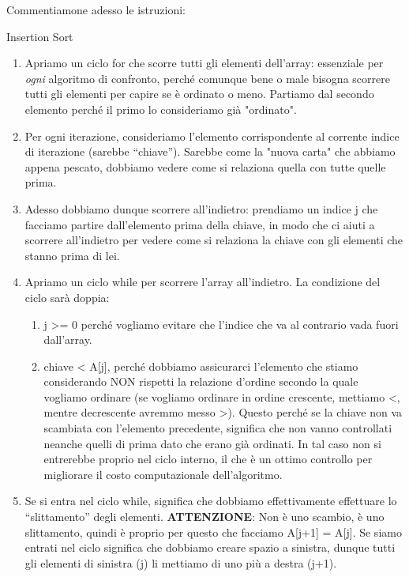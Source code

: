 \documentclass[12pt]{report}
\begin{document}
    Commentiamone adesso le istruzioni:
    \begin{algoritmo}{Insertion Sort}{}
    	
    	\begin{enumerate}
    		
    		\item Apriamo un ciclo for che scorre tutti gli elementi dell'array: essenziale per \textit{ogni} algoritmo di confronto, perché comunque bene o male bisogna scorrere tutti gli elementi per capire se è ordinato o meno. Partiamo dal secondo elemento perché il primo lo consideriamo già "ordinato".
    				
    		\item Per ogni iterazione, consideriamo l'elemento corrispondente al corrente indice di iterazione (sarebbe “chiave”). Sarebbe come la "nuova carta" che abbiamo appena pescato, dobbiamo vedere come si relaziona quella con tutte quelle prima.
    				
    		\item Adesso dobbiamo dunque scorrere all'indietro: prendiamo un indice j che facciamo partire dall'elemento prima della chiave, in modo che ci aiuti a scorrere all'indietro per vedere come si relaziona la chiave con gli elementi che stanno prima di lei.
    				
    		\item Apriamo un ciclo while per scorrere l’array all’indietro. La condizione del ciclo sarà doppia:
    		\begin{enumerate}
    					
    			\item j >= 0 perché vogliamo evitare che l'indice che va al contrario vada fuori dall'array.
    					
    			\item chiave < A[j], perché dobbiamo assicurarci l’elemento che stiamo considerando NON rispetti la relazione d’ordine secondo la quale vogliamo ordinare (se vogliamo ordinare in ordine crescente, mettiamo <, mentre decrescente avremmo messo >). Questo perché se la chiave non va scambiata con l’elemento precedente, significa che non vanno controllati neanche quelli di prima dato che erano già ordinati. In tal caso non si entrerebbe proprio nel ciclo interno, il che è un ottimo controllo per migliorare il costo computazionale dell’algoritmo.
    					
    		\end{enumerate}
    				
    		\item Se si entra nel ciclo while, significa che dobbiamo effettivamente effettuare lo “slittamento” degli elementi. \textbf{ATTENZIONE}: Non è uno scambio, è uno slittamento, quindi è proprio per questo che facciamo A[j+1] = A[j]. Se siamo entrati nel ciclo significa che dobbiamo creare spazio a sinistra, dunque tutti gli elementi di sinistra (j) li mettiamo di uno più a destra (j+1).
    				

\end{enumerate}
\end{algoritmo}
\end{document}
